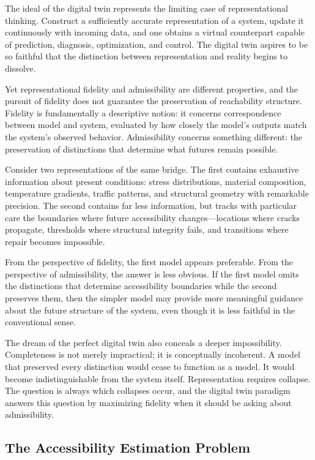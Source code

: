 \documentclass[12pt,a4paper]{article}
\theoremstyle{plain}
\theoremstyle{definition}
\theoremstyle{remark}
\begin{document}
The ideal of the digital twin represents the limiting case of
representational thinking. Construct a sufficiently accurate representation
of a system, update it continuously with incoming data, and one obtains a
virtual counterpart capable of prediction, diagnosis, optimization, and
control. The digital twin aspires to be so faithful that the distinction
between representation and reality begins to dissolve.

Yet representational fidelity and admissibility are different properties, and
the pursuit of fidelity does not guarantee the preservation of reachability
structure. Fidelity is fundamentally a descriptive notion: it concerns
correspondence between model and system, evaluated by how closely the model's
outputs match the system's observed behavior. Admissibility concerns something
different: the preservation of distinctions that determine what futures remain
possible.

Consider two representations of the same bridge. The first contains
exhaustive information about present conditions: stress distributions,
material composition, temperature gradients, traffic patterns, and structural
geometry with remarkable precision. The second contains far less information,
but tracks with particular care the boundaries where future accessibility
changes---locations where cracks propagate, thresholds where structural
integrity fails, and transitions where repair becomes impossible.

From the perspective of fidelity, the first model appears preferable. From
the perspective of admissibility, the answer is less obvious. If the first
model omits the distinctions that determine accessibility boundaries while
the second preserves them, then the simpler model may provide more meaningful
guidance about the future structure of the system, even though it is less
faithful in the conventional sense.

The dream of the perfect digital twin also conceals a deeper impossibility.
Completeness is not merely impractical; it is conceptually incoherent.
A model that preserved every distinction would cease to function as a model.
It would become indistinguishable from the system itself. Representation
requires collapse. The question is always which collapses occur, and the
digital twin paradigm answers this question by maximizing fidelity when it
should be asking about admissibility.

\subsection{The Accessibility Estimation Problem}
\end{document}
